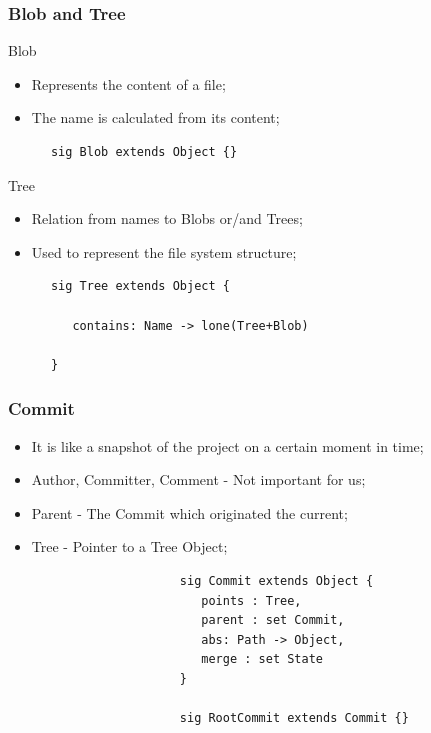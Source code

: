 \documentclass{beamer}
\begin{document}
\begin{frame}[fragile]
   \frametitle{Blob and Tree}
   \begin{block}{Blob}
      \begin{itemize}
         \item Represents the content of a file;
         \item The name is calculated from its content;
      \end{itemize}
      \tiny
      \color{blue}
      \begin{lstlisting}
      sig Blob extends Object {}
      \end{lstlisting}
   \end{block}
   \begin{block}{Tree}
      \begin{itemize}
         \item Relation from names to Blobs or/and Trees;
         \item Used to represent the file system structure;
      \end{itemize}
      \tiny
      \color{blue}
      \begin{lstlisting}
      sig Tree extends Object {
         
         contains: Name -> lone(Tree+Blob)
      
      }
      \end{lstlisting}
   \end{block}
\end{frame}




\begin{frame}[fragile]
   \frametitle{Commit}
   \begin{itemize}
      \item It is like a snapshot of the project on a certain moment
      in time;
      \item Author, Committer, Comment - Not important for us;
      \item Parent - The Commit which originated the current;
      \item Tree - Pointer to a Tree Object;
   \end{itemize}
   \tiny
   \color{blue}
   \begin{lstlisting}
                        sig Commit extends Object {
                           points : Tree,
                           parent : set Commit,
                           abs: Path -> Object,
                           merge : set State
                        }
                           
                        sig RootCommit extends Commit {}
\end{lstlisting}
\end{frame}
\end{document}
